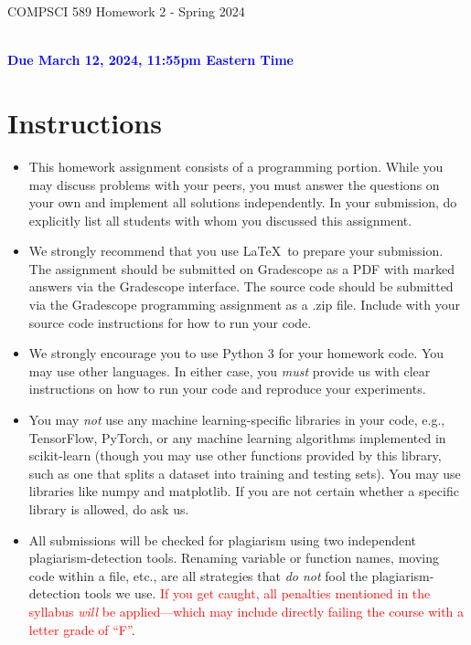 \documentclass[letterpaper]{article}
\newcommand{\HIGHLIGHT}[1]{\textcolor{blue}{\textbf{#1}}}
\begin{document}
\newpage
\begin{center}
    \begin{Large}
    COMPSCI 589 Homework 2 - Spring 2024
    \end{Large}
    \\
    \HIGHLIGHT{Due March 12, 2024, 11:55pm Eastern Time}
\end{center}



\vspace{0.25in}
\section{Instructions}

\begin{itemize}
    \item This homework assignment consists of a programming portion. While you may discuss problems with your peers, you must answer the questions on your own and implement all solutions independently. In your submission, do explicitly list all students with whom you discussed this assignment. 
    \item We strongly recommend that you use \LaTeX~to prepare your submission. The assignment should be submitted on Gradescope as a PDF with marked answers via the Gradescope interface. The source code should be submitted via the Gradescope programming assignment as a .zip file. Include with your source code instructions for how to run your code. 
    \item We strongly encourage you to use Python 3 for your homework code. You may use other languages. In either case, you \textit{must} provide us with clear instructions on how to run your code and reproduce your experiments. 
    \item You may \textit{not} use any machine learning-specific libraries in your code, e.g., TensorFlow, PyTorch, or any machine learning algorithms implemented in scikit-learn (though you may use other functions provided by this library, such as one that splits a dataset into training and testing sets). You may use libraries like numpy and matplotlib. If you are not certain whether a specific library is allowed, do ask us.
    \item All submissions will be checked for plagiarism using two independent plagiarism-detection tools. Renaming variable or function names, moving code within a file, etc., are all strategies that \textit{do not} fool the plagiarism-detection tools we use. \textcolor{red}{If you get caught, all penalties mentioned in the syllabus \textit{will} be applied---which may include directly failing the course with a letter grade of ``F''}.
    \begin{center}


\end{center}
\end{itemize}
\end{document}

